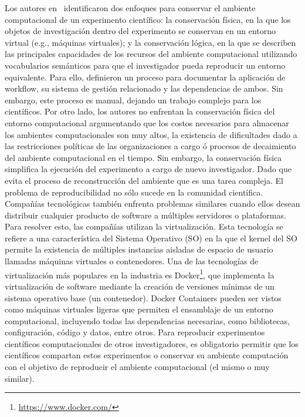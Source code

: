 Los autores en~\cite{santana2017reproducibility} identificaron dos enfoques para conservar el ambiente computacional de un experimento científico: la conservación física, en la que los objetos de investigación dentro del experimento se conservan en un entorno virtual (e.g., máquinas virtuales); y la conservación lógica, en la que se describen las principales capacidades de los recursos del ambiente computacional utilizando vocabularios semánticos para que el investigador pueda reproducir un entorno equivalente.
Para ello, definieron un proceso para documentar la aplicación de workflow, su sistema de gestión relacionado y las dependencias de ambos.
Sin embargo, este proceso es manual, dejando un trabajo complejo para los científicos. 
Por otro lado, los autores no enfrentan la conservación física del entorno computacional argumentando que los costos necesarios para almacenar los ambientes computacionales son muy altos, la existencia de dificultades dado a las restricciones políticas de las organizaciones a cargo ó procesos de decaimiento del ambiente computacional en el tiempo. Sin embargo, la conservación física simplifica la ejecución del experimento a cargo de nuevo investigador. Dado que evita el proceso de reconstrucción del ambiente que es una tarea compleja.
El problema de reproducibilidad no sólo sucede en la comunidad científica. Compañías tecnológicas también enfrenta problemas similares cuando ellos desean distribuir cualquier producto de software a múltiples servidores o plataformas.
Para resolver esto, las compañías utilizan la virtualización. Esta tecnología se refiere a una característica del Sistema Operativo (SO) en la que el kernel del SO permite la existencia de múltiples instancias aisladas de espacio de usuario llamadas máquinas virtuales o contenedores.
Una de las tecnologías de virtualización más populares en la industria es Docker\footnote{\url{https://www.docker.com/}}, que implementa la virtualización de software mediante la creación de versiones mínimas de un sistema operativo base (un contenedor).
Docker Containers pueden ser vistos como máquinas virtuales ligeras que permiten el ensamblaje de un entorno computacional, incluyendo todas las dependencias necesarias, como bibliotecas, configuración, código y datos, entre otros.
Para reproducir experimentos científicos computacionales de otros investigadores, es obligatorio permitir que los científicos compartan estos experimentos o conservar su ambiente computación con el objetivo de reproducir el ambiente computacional  (el mismo o muy similar).
